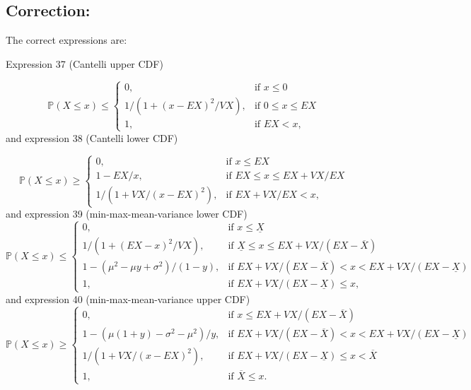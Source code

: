 \documentclass{article}
\begin{document}
\subsection*{Correction:}
The correct expressions are:

\noindent Expression 37 (Cantelli upper CDF)

\begin{equation}
  \mathbb{P}(X \leq x)  \leq \begin{cases} 0,& \text{if } x \leq0 \\
    1 / (1 + (x - EX)^2 / VX),& \text{if } 0 \leq x\leq EX \\
                                    1,& \text{if } EX < x , \end{cases}
\end{equation}
\noindent and expression 38 (Cantelli lower CDF)

\begin{equation}
  \mathbb{P}(X \leq x)  \geq \begin{cases} 0,& \text{if } x \leq EX \\
    1 - EX/x,& \text{if } EX \leq x\leq EX+VX/EX \\
    1 / (1 + VX / (x - EX)^2 ),& \text{if } EX + VX/EX < x  ,\end{cases}
\end{equation}
\noindent and expression 39 (min-max-mean-variance lower CDF)
\begin{equation}
  \mathbb{P}(X \leq x)  \leq \begin{cases} 0,& \text{if } x \leq \underline{X} \\
  1/(1 + (EX - x)^2/VX),& \text{if } \underline{X} \leq x\leq EX+VX/(EX-\overline{X}) \\
  
  1 - (\mu^2 -\mu y + \sigma^2)/(1-y) ,& \text{if } EX+VX/(EX-\overline{X}) < x < EX+VX/(EX-\underline{X})\\
  
    1,& \text{if } EX+VX/(EX-\underline{X}) \leq x,  \end{cases}
\end{equation}
\noindent and expression 40 (min-max-mean-variance upper CDF)
\begin{equation}
  \mathbb{P}(X \leq x)  \geq \begin{cases} 0,& \text{if } x \leq  EX+VX/(EX-\overline{X}) \\
  
  1 - (\mu (1+y) - \sigma^2 - \mu^2)/y ,& \text{if }  EX+VX/(EX-\overline{X}) < x <  EX+VX/(EX-\underline{X}) \\
  
   1/(1 + VX/(x - EX)^2) ,& \text{if } EX+VX/(EX-\underline{X}) \leq x < \overline{X}\\
  
    1,& \text{if } \overline{X} \leq x.  \end{cases}
\end{equation}
\end{document}
